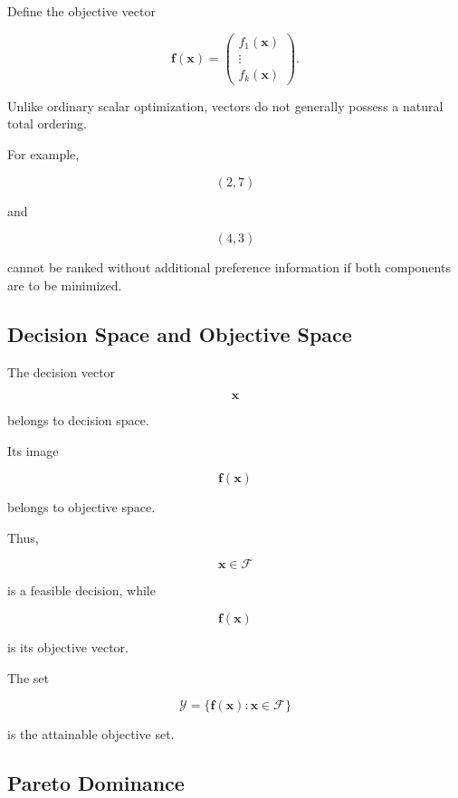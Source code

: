Define the objective vector

\[
\boxed{
\mathbf{f}(\mathbf{x})
=
\begin{pmatrix}
f_1(\mathbf{x})\\
\vdots\\
f_k(\mathbf{x})
\end{pmatrix}.
}
\]

Unlike ordinary scalar optimization, vectors do not generally possess a
natural total ordering.

For example,

\[
(2,7)
\]

and

\[
(4,3)
\]

cannot be ranked without additional preference information if both
components are to be minimized.

\subsection{Decision Space and Objective Space}
\label{subsec:decision-objective-space}

The decision vector

\[
\mathbf{x}
\]

belongs to decision space.

Its image

\[
\mathbf{f}(\mathbf{x})
\]

belongs to objective space.

Thus,

\[
\boxed{
\mathbf{x}
\in
\mathcal{F}
}
\]

is a feasible decision, while

\[
\boxed{
\mathbf{f}(\mathbf{x})
}
\]

is its objective vector.

The set

\[
\boxed{
\mathcal{Y}
=
\{
\mathbf{f}(\mathbf{x}):
\mathbf{x}\in\mathcal{F}
\}
}
\]

is the attainable objective set.

\subsection{Pareto Dominance}
\label{subsec:pareto-dominance}

